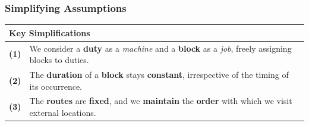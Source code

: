 \documentclass[handout]{beamer}
\begin{document}
\begin{frame}
	\frametitle{Simplifying Assumptions}
	\vspace{\baselineskip}
	\begin{table}[h]
		\centering
		\begin{tabular}{p{} p{}} 
			\toprule
			\multicolumn{2}{p{0.8\textwidth}}{\textbf{Key Simplifications}} \\
			\midrule
			\textbf{(1)}       & We consider a \textbf{duty} as a \textit{machine} and a \textbf{block} as a \textit{job}, freely assigning blocks to duties. \\
			\textbf{(2)}       & The \textbf{duration} of a \textbf{block} stays \textbf{constant}, irrespective of the timing of its occurrence.\\
			\textbf{(3)}  & The \textbf{routes} are \textbf{fixed}, and we \textbf{maintain} the \textbf{order} with which we visit external locations.\\
			\bottomrule
		\end{tabular} 
	\end{table}


\end{frame}

\end{document}
